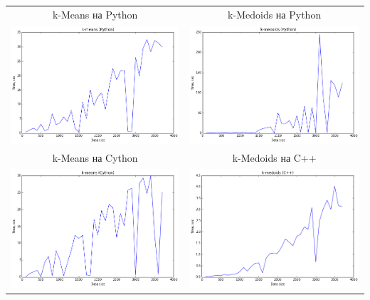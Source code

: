 \documentclass[12pt, a4paper]{article}
\begin{document}
			\begin{center}
			\begin{tabular}{c c}
				k-Means на Python & k-Medoids на Python \\

				\includegraphics[width=8cm]{python_kmeans_time.png} &
				\includegraphics[width=8cm]{python_kmedoids_time.png} \\

				k-Means на Cython & k-Medoids на C++ \\

				\includegraphics[width=8cm]{cython_kmeans_time.png} &
				\includegraphics[width=8cm]{cpp_kmedoids_time.png} \\
			\end{tabular}
			\end{center}
\end{document}
